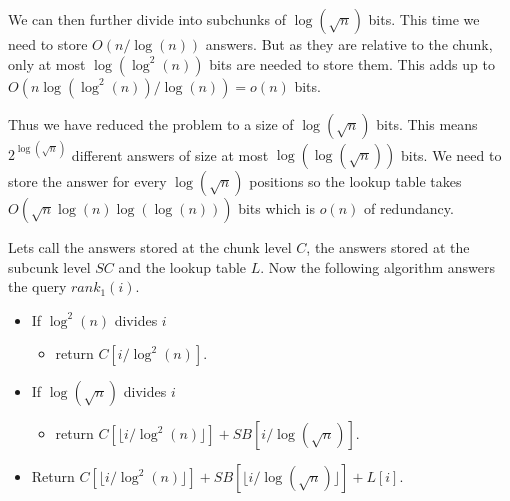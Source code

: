 \documentclass[11pt]{article}
\newcommand{\bigo}{O}
\newcommand{\smallo}{o}
\newcommand{\rank}{\textit{rank}}
\begin{document}
We can then further divide into subchunks of $\log(\sqrt{n})$ bits.
This time we need to store $\bigo(n / \log(n))$ answers. But as they
are relative to the chunk, only at most $\log(\log^2(n))$ bits are
needed to store them. This adds up to $\bigo(n\log(\log^2(n)) /
\log(n)) = \smallo(n)$ bits.

Thus we have reduced the problem to a size of $\log(\sqrt{n})$ bits.
This means $2^{\log(\sqrt{n})}$ different answers of size at most
$\log(\log(\sqrt{n}))$ bits. We need to store the answer for every
$\log(\sqrt{n})$ positions so the lookup table takes $\bigo(\sqrt{n}
\log(n) \log(\log(n)))$ bits which is $\smallo(n)$ of redundancy.

Lets call the answers stored at the chunk level $C$, the answers
stored at the subcunk level $SC$ and the lookup table $L$. Now the
following algorithm answers the query $\rank_1(i)$.

\begin{itemize}
\item If $\log^2(n)$ divides $i$
  \begin{itemize}
  \item return $C[i / \log^2(n)]$.
  \end{itemize}

\item If $\log(\sqrt{n})$ divides $i$
  \begin{itemize}
  \item return $C[\lfloor i / \log^2(n)\rfloor ] + SB[i /
    \log(\sqrt{n})]$.
  \end{itemize}

\item Return $C[\lfloor i / \log^2(n)\rfloor ] + SB[\lfloor i /
  \log(\sqrt{n}) \rfloor] + L[i]$.
\end{itemize}
\end{document}
